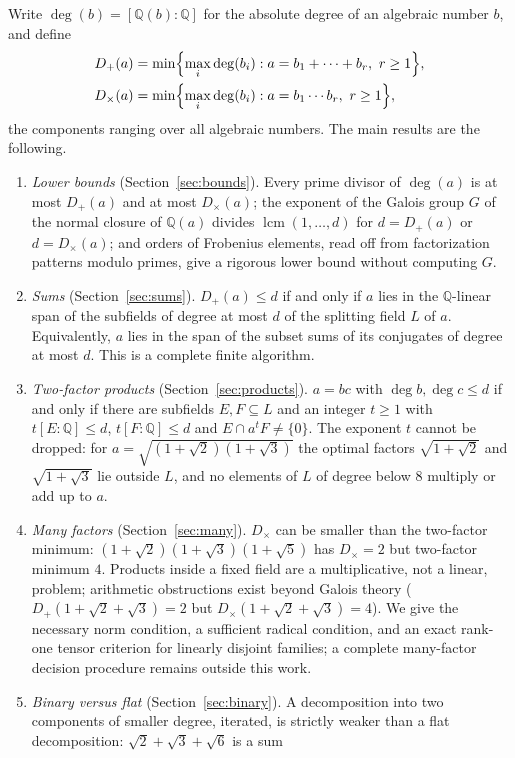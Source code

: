 \documentclass[11pt,a4paper]{article}
\theoremstyle{definition}
\theoremstyle{remark}
\newcommand{\Q}{\mathbb{Q}}
\newcommand{\lcm}{\operatorname{lcm}}
\newcommand{\dg}{\deg}
\newcommand{\Dp}{D_{+}}
\newcommand{\Dt}{D_{\times}}
\begin{document}
Write $\dg(b)=[\Q(b):\Q]$ for the absolute degree of an algebraic number $b$, and define
\begin{align*}
 \Dp(a)&=\min\Bigl\{\max_i\dg(b_i): a=b_1+\dots+b_r,\ r\ge1\Bigr\},\\
 \Dt(a)&=\min\Bigl\{\max_i\dg(b_i): a=b_1\cdots b_r,\ r\ge1\Bigr\},
\end{align*}
the components ranging over all algebraic numbers.  The main results are the following.
\begin{enumerate}[label=(\roman*)]
\item \emph{Lower bounds} (Section~\ref{sec:bounds}).  Every prime divisor of $\dg(a)$ is at most
  $\Dp(a)$ and at most $\Dt(a)$; the exponent of the Galois group $G$ of the normal closure of $\Q(a)$
  divides $\lcm(1,\dots,d)$ for $d=\Dp(a)$ or $d=\Dt(a)$; and orders of Frobenius elements, read off from
  factorization patterns modulo primes, give a rigorous lower bound without computing $G$.
\item \emph{Sums} (Section~\ref{sec:sums}).  $\Dp(a)\le d$ if and only if $a$ lies in the $\Q$-linear
  span of the subfields of degree at most $d$ of the splitting field $L$ of $a$.  Equivalently, $a$ lies
  in the span of the subset sums of its conjugates of degree at most $d$.  This is a complete finite
  algorithm.
\item \emph{Two-factor products} (Section~\ref{sec:products}).  $a=bc$ with $\dg b,\dg c\le d$ if and
  only if there are subfields $E,F\subseteq L$ and an integer $t\ge1$ with $t[E:\Q]\le d$, $t[F:\Q]\le d$
  and $E\cap a^tF\ne\{0\}$.  The exponent $t$ cannot be dropped: for $a=\sqrt{(1+\sqrt2)(1+\sqrt3)}$
  the optimal factors $\sqrt{1+\sqrt2}$ and $\sqrt{1+\sqrt3}$ lie outside $L$, and no elements of $L$
  of degree below $8$ multiply or add up to $a$.
\item \emph{Many factors} (Section~\ref{sec:many}).  $\Dt$ can be smaller than the two-factor
  minimum: $(1+\sqrt2)(1+\sqrt3)(1+\sqrt5)$ has $\Dt=2$ but two-factor minimum $4$.
  Products inside a fixed field are a multiplicative, not a linear, problem; arithmetic obstructions
  exist beyond Galois theory ($\Dp(1+\sqrt2+\sqrt3)=2$ but $\Dt(1+\sqrt2+\sqrt3)=4$).  We give the
  necessary norm condition, a sufficient radical condition, and an exact rank-one tensor criterion for
  linearly disjoint families; a complete many-factor decision procedure remains outside this work.
\item \emph{Binary versus flat} (Section~\ref{sec:binary}).  A decomposition into two components of
  smaller degree, iterated, is strictly weaker than a flat decomposition: $\sqrt2+\sqrt3+\sqrt6$ is a sum

\end{enumerate}
\end{document}
